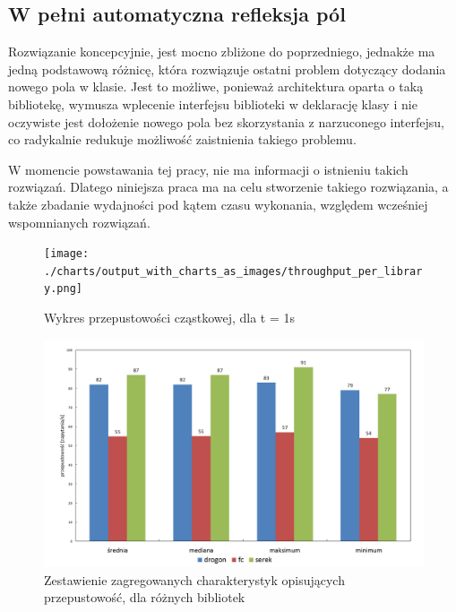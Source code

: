 \documentclass[12pt]{article}
\newcommand{\n}{\newline}
\begin{document}
{{{		{
			\subsection{W pełni automatyczna refleksja pól}

			Rozwiązanie koncepcyjnie, jest mocno zbliżone do poprzedniego, jednakże ma jedną podstawową różnicę, która rozwiązuje ostatni
			problem dotyczący dodania nowego pola w klasie. Jest to możliwe, ponieważ architektura oparta o taką bibliotekę, wymusza wplecenie
			interfejsu biblioteki w deklarację klasy i nie oczywiste jest dołożenie nowego pola bez skorzystania z narzuconego interfejsu, co
			radykalnie redukuje możliwość zaistnienia takiego problemu.\n

			W momencie powstawania tej pracy, nie ma informacji o istnieniu takich rozwiązań. Dlatego niniejsza praca ma na celu
			stworzenie takiego rozwiązania, a także zbadanie wydajności pod kątem czasu wykonania, względem wcześniej wspomnianych rozwiązań.
			
		}
	}

	\newpage

	{
		\begin{figure}[H]
			\centering
			\texttt{[image: ./charts/output\_with\_charts\_as\_images/throughput\_per\_library.png]}
			\caption{Wykres przepustowości cząstkowej, dla \Delta t  = 1s}
			\medskip
		\end{figure}
	}

	{
		\begin{figure}[H]
			\centering
			\includegraphics[width=15cm,keepaspectratio=true]{./charts/pre_generated_charts/throughput_summary_per_library_summary.png}
			\caption{Zestawienie zagregowanych charakterystyk opisujących przepustowość, dla różnych bibliotek}
			\medskip
		\end{figure}
	}

}}
\end{document}
